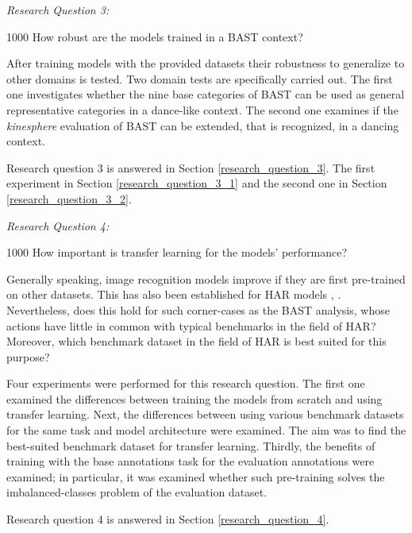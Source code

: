 \documentclass[extern,palatino]{cgMA}
\begin{document}
\bigskip \bigskip
\emph{Research Question 3:}
\bigskip
\begin{adjustwidth}{100}{0}
How robust are the models trained in a BAST context? 
\bigskip

\noindent After training models with the provided datasets their robustness to generalize to other domains is tested. Two domain tests are specifically carried out. The first one investigates whether the nine base categories of BAST can be used as general representative categories in a dance-like context. The second one examines if the \textit{kinesphere} evaluation of BAST can be extended, that is recognized, in a dancing context.

\noindent Research question 3 is answered in Section \ref{research_question_3}. The first experiment in Section \ref{research_question_3_1} and the second one in Section \ref{research_question_3_2}.
\end{adjustwidth}

\bigskip \bigskip
\emph{Research Question 4:}
\bigskip
\begin{adjustwidth}{100}{0}
How important is transfer learning for the models' performance?
\bigskip

\noindent Generally speaking, image recognition models improve if they are first pre-trained on other datasets. This has also been established for HAR models \cite{carreira2017quo}, \cite{duan2020omni}. Nevertheless, does this hold for such corner-cases as the BAST analysis, whose actions have little in common with typical benchmarks in the field of HAR? Moreover, which benchmark dataset in the field of HAR is best suited for this purpose?

\noindent Four experiments were performed for this research question. The first one examined the differences between training the models from scratch and using transfer learning. Next, the differences between using various benchmark datasets for the same task and model architecture were examined. The aim was to find the best-suited benchmark dataset for transfer learning. Thirdly, the benefits of training with the base annotations task for the evaluation annotations were examined; in particular, it was examined whether such pre-training solves the imbalanced-classes problem of the evaluation dataset.

\noindent Research question 4 is answered in Section \ref{research_question_4}.
\end{adjustwidth}
\end{document}
